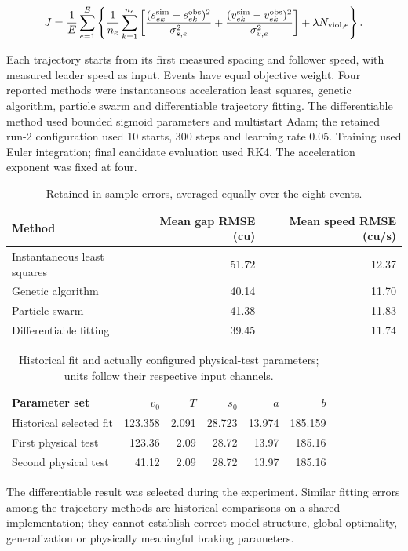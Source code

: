 \documentclass[11pt,a4paper]{article}
\begin{document}
\[
J=\frac1E\sum_{e=1}^{E}\left\{\frac1{n_e}\sum_{k=1}^{n_e}
        \left[\frac{(s^{\rm sim}_{ek}-s^{\rm obs}_{ek})^2}{\sigma_{s,e}^2}
        +\frac{(v^{\rm sim}_{ek}-v^{\rm obs}_{ek})^2}{\sigma_{v,e}^2}\right]
        +\lambda N_{{\rm viol},e}\right\}.
\]

Each trajectory starts from its first measured spacing and follower speed, with measured leader speed as input. Events have equal objective weight. Four reported methods were instantaneous acceleration least squares, genetic algorithm, particle swarm and differentiable trajectory fitting. The differentiable method used bounded sigmoid parameters and multistart Adam; the retained run-2 configuration used 10 starts, 300 steps and learning rate 0.05. Training used Euler integration; final candidate evaluation used RK4. The acceleration exponent was fixed at four.


\begin{table}[H]\centering\small
\caption{Retained in-sample errors, averaged equally over the eight events.}
\begin{tabular}{lrr}
\toprule
Method & Mean gap RMSE (cu) & Mean speed RMSE (cu/s) \\
\midrule
Instantaneous least squares & 51.72 & 12.37 \\
Genetic algorithm & 40.14 & 11.70 \\
Particle swarm & 41.38 & 11.83 \\
Differentiable fitting & 39.45 & 11.74 \\
\bottomrule\end{tabular}\end{table}

\begin{table}[H]\centering\small
\caption{Historical fit and actually configured physical-test parameters; units follow their respective input channels.}
\begin{tabular}{lrrrrr}
\toprule
Parameter set & $v_0$ & $T$ & $s_0$ & $a$ & $b$ \\
\midrule
Historical selected fit & 123.358 & 2.091 & 28.723 & 13.974 & 185.159 \\
First physical test & 123.36 & 2.09 & 28.72 & 13.97 & 185.16 \\
Second physical test & 41.12 & 2.09 & 28.72 & 13.97 & 185.16 \\
\bottomrule\end{tabular}\end{table}

The differentiable result was selected during the experiment. Similar fitting errors among the trajectory methods are historical comparisons on a shared implementation; they cannot establish correct model structure, global optimality, generalization or physically meaningful braking parameters.
\end{document}
